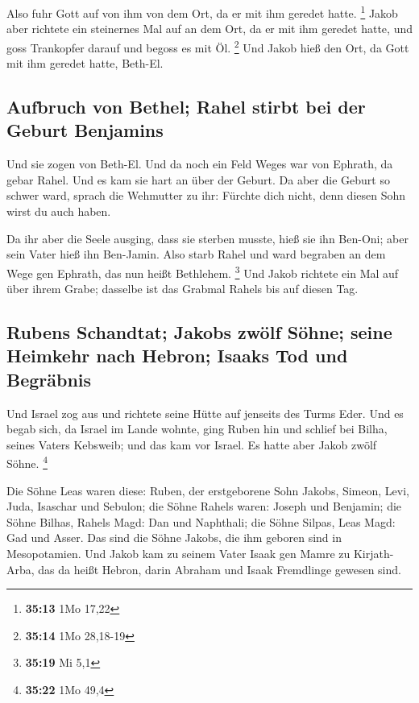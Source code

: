  Also fuhr Gott auf von ihm von dem Ort, da er mit ihm
geredet hatte. \footnote{\textbf{35:13} 1Mo 17,22}  Jakob
aber richtete ein steinernes Mal auf an dem Ort, da er mit ihm geredet
hatte, und goss Trankopfer darauf und begoss es mit Öl. \footnote{\textbf{35:14}
  1Mo 28,18-19}  Und Jakob hieß den Ort, da Gott mit ihm
geredet hatte, Beth-El.

\hypertarget{aufbruch-von-bethel-rahel-stirbt-bei-der-geburt-benjamins}{%
\subsection{Aufbruch von Bethel; Rahel stirbt bei der Geburt
Benjamins}\label{aufbruch-von-bethel-rahel-stirbt-bei-der-geburt-benjamins}}

 Und sie zogen von Beth-El. Und da noch ein Feld Weges
war von Ephrath, da gebar Rahel.  Und es kam sie hart an
über der Geburt. Da aber die Geburt so schwer ward, sprach die Wehmutter
zu ihr: Fürchte dich nicht, denn diesen Sohn wirst du auch haben.

 Da ihr aber die Seele ausging, dass sie sterben musste,
hieß sie ihn Ben-Oni; aber sein Vater hieß ihn Ben-Jamin.
 Also starb Rahel und ward begraben an dem Wege gen
Ephrath, das nun heißt Bethlehem. \footnote{\textbf{35:19} Mi 5,1}
 Und Jakob richtete ein Mal auf über ihrem Grabe;
dasselbe ist das Grabmal Rahels bis auf diesen Tag.

\hypertarget{rubens-schandtat-jakobs-zwuxf6lf-suxf6hne-seine-heimkehr-nach-hebron-isaaks-tod-und-begruxe4bnis}{%
\subsection{Rubens Schandtat; Jakobs zwölf Söhne; seine Heimkehr nach
Hebron; Isaaks Tod und
Begräbnis}\label{rubens-schandtat-jakobs-zwuxf6lf-suxf6hne-seine-heimkehr-nach-hebron-isaaks-tod-und-begruxe4bnis}}

 Und Israel zog aus und richtete seine Hütte auf jenseits
des Turms Eder.  Und es begab sich, da Israel im Lande
wohnte, ging Ruben hin und schlief bei Bilha, seines Vaters Kebsweib;
und das kam vor Israel. Es hatte aber Jakob zwölf Söhne. \footnote{\textbf{35:22}
  1Mo 49,4}

 Die Söhne Leas waren diese: Ruben, der erstgeborene Sohn
Jakobs, Simeon, Levi, Juda, Isaschar und Sebulon;  die
Söhne Rahels waren: Joseph und Benjamin;  die Söhne
Bilhas, Rahels Magd: Dan und Naphthali;  die Söhne
Silpas, Leas Magd: Gad und Asser. Das sind die Söhne Jakobs, die ihm
geboren sind in Mesopotamien.  Und Jakob kam zu seinem
Vater Isaak gen Mamre zu Kirjath-Arba, das da heißt Hebron, darin
Abraham und Isaak Fremdlinge gewesen sind.

